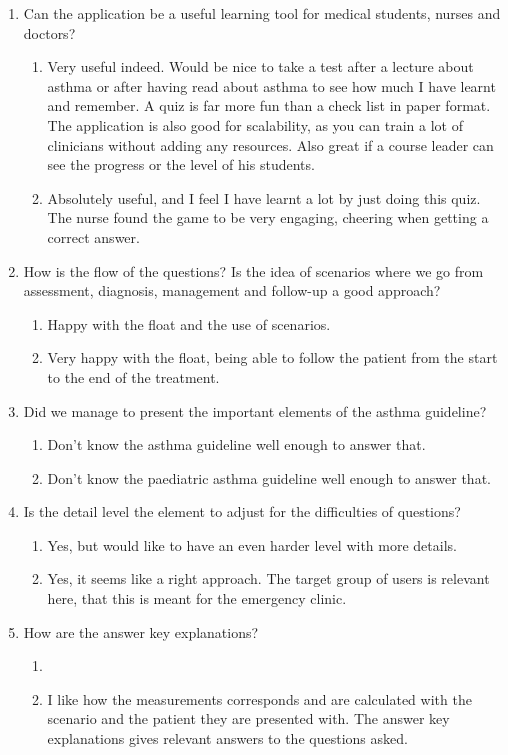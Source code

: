 \begin{enumerate}
	\item Can the application be a useful learning tool for medical students, nurses and doctors?
	\begin{enumerate}
		\item Very useful indeed. Would be nice to take a test after a lecture about asthma or after having read about asthma to see how much I have learnt and remember. A quiz is far more fun than a check list in paper format. The application is also good for scalability, as you can train a lot of clinicians without adding any resources. Also great if a course leader can see the progress or the level of his students.
		\item Absolutely useful, and I feel I have learnt a lot by just doing this quiz. The nurse found the game to be very engaging, cheering when getting a correct answer. 
	\end{enumerate}
	\item How is the flow of the questions? Is the idea of scenarios where we go from assessment, diagnosis, management and follow-up a good approach?
	\begin{enumerate}
		\item Happy with the float and the use of scenarios.
		\item Very happy with the float, being able to follow the patient from the start to the end of the treatment.
	\end{enumerate}
	\item Did we manage to present the important elements of the asthma guideline?
	\begin{enumerate}
		\item Don't know the asthma guideline well enough to answer that.
		\item Don't know the paediatric asthma guideline well enough to answer that.
	\end{enumerate}
	\item Is the detail level the element to adjust for the difficulties of questions?
	\begin{enumerate}
		\item Yes, but would like to have an even harder level with more details.
		\item Yes, it seems like a right approach. The target group of users is relevant here, that this is meant for the emergency clinic.
	\end{enumerate}
	\item How are the answer key explanations?
	\begin{enumerate}
		\item 
		\item I like how the measurements corresponds and are calculated with the scenario and the patient they are presented with. The answer key explanations gives relevant answers to the questions asked.
	\end{enumerate}
\end{enumerate}

